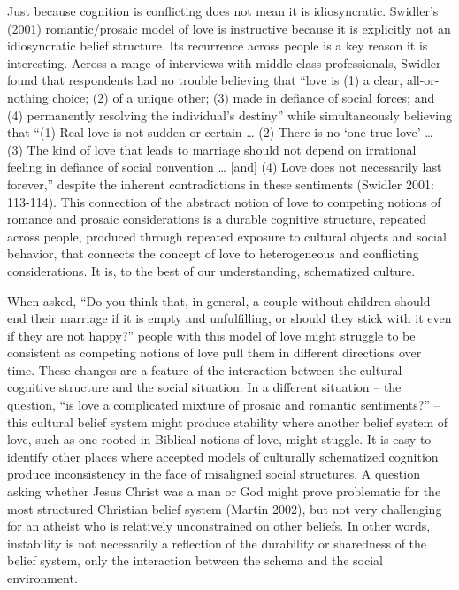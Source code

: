 \documentclass[12pt,]{article}
\begin{document}
Just because cognition is conflicting does not mean it is idiosyncratic. Swidler's (2001) romantic/prosaic model of love is instructive because it is explicitly not an idiosyncratic belief structure. Its recurrence across people is a key reason it is interesting. Across a range of interviews with middle class professionals, Swidler found that respondents had no trouble believing that ``love is (1) a clear, all-or-nothing choice; (2) of a unique other; (3) made in defiance of social forces; and (4) permanently resolving the individual's destiny'' while simultaneously believing that ``(1) Real love is not sudden or certain \ldots{} (2) There is no `one true love' \ldots{} (3) The kind of love that leads to marriage should not depend on irrational feeling in defiance of social convention \ldots{} {[}and{]} (4) Love does not necessarily last forever,'' despite the inherent contradictions in these sentiments (Swidler 2001: 113-114). This connection of the abstract notion of love to competing notions of romance and prosaic considerations is a durable cognitive structure, repeated across people, produced through repeated exposure to cultural objects and social behavior, that connects the concept of love to heterogeneous and conflicting considerations. It is, to the best of our understanding, schematized culture.

When asked, ``Do you think that, in general, a couple without children should end their marriage if it is empty and unfulfilling, or should they stick with it even if they are not happy?'' people with this model of love might struggle to be consistent as competing notions of love pull them in different directions over time. These changes are a feature of the interaction between the cultural-cognitive structure and the social situation. In a different situation -- the question, ``is love a complicated mixture of prosaic and romantic sentiments?'' -- this cultural belief system might produce stability where another belief system of love, such as one rooted in Biblical notions of love, might stuggle. It is easy to identify other places where accepted models of culturally schematized cognition produce inconsistency in the face of misaligned social structures. A question asking whether Jesus Christ was a man or God might prove problematic for the most structured Christian belief system (Martin 2002), but not very challenging for an atheist who is relatively unconstrained on other beliefs. In other words, instability is not necessarily a reflection of the durability or sharedness of the belief system, only the interaction between the schema and the social environment.
\end{document}
